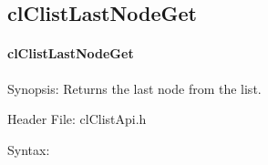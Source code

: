 \begin{flushleft}
\subsection{clClistLastNodeGet}
\hypertarget{pagecl108}{}\paragraph{cl\-Clist\-Last\-Node\-Get}\label{pagecl108}
\begin{Desc}
\item[Synopsis:]Returns the last node from the list.\end{Desc}
\begin{Desc}
\item[Header File:]clClistApi.h\end{Desc}
\begin{Desc}
\item[Syntax:]


\end{Desc}
\end{flushleft}
